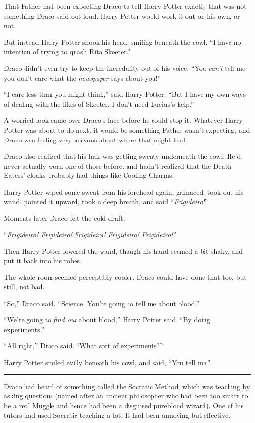 That Father had been expecting Draco to tell Harry Potter exactly that was not something Draco said out loud. Harry Potter would work it out on his own, or not.

But instead Harry Potter shook his head, smiling beneath the cowl. ``I have no intention of trying to quash Rita Skeeter.''

Draco didn't even try to keep the incredulity out of his voice. ``You \emph{can't} tell me you don't care what the \emph{newspaper} says about you!''

``I care less than you might think,'' said Harry Potter. ``But I have my own ways of dealing with the likes of Skeeter. I don't need Lucius's help.''

A worried look came over Draco's face before he could stop it. Whatever Harry Potter was about to do next, it would be something Father wasn't expecting, and Draco was feeling very nervous about where that might lead.

Draco also realized that his hair was getting sweaty underneath the cowl. He'd never actually worn one of those before, and hadn't realized that the Death Eaters' cloaks probably had things like Cooling Charms.

Harry Potter wiped some sweat from his forehead again, grimaced, took out his wand, pointed it upward, took a deep breath, and said ``\emph{Frigideiro!}''

Moments later Draco felt the cold draft.

``\emph{Frigideiro! Frigideiro! Frigideiro! Frigideiro! Frigideiro!}''

Then Harry Potter lowered the wand, though his hand seemed a bit shaky, and put it back into his robes.

The whole room seemed perceptibly cooler. Draco could have done that too, but still, not bad.

``So,'' Draco said. ``Science. You're going to tell me about blood.''

``We're going to \emph{find out} about blood,'' Harry Potter said. ``By doing experiments.''

``All right,'' Draco said. ``What sort of experiments?''

Harry Potter smiled evilly beneath his cowl, and said, ``You tell me.''

\begin{center}\rule{3in}{0.4pt}\end{center}

Draco had heard of something called the Socratic Method, which was teaching by asking questions (named after an ancient philosopher who had been too smart to be a real Muggle and hence had been a disguised pureblood wizard). One of his tutors had used Socratic teaching a lot. It had been annoying but effective.

